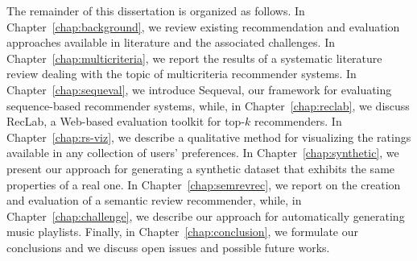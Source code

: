 The remainder of this dissertation is organized as follows. In Chapter~\ref{chap:background}, we review existing recommendation and evaluation approaches available in literature and the associated challenges. In Chapter~\ref{chap:multicriteria}, we report the results of a systematic literature review dealing with the topic of multicriteria recommender systems. In Chapter~\ref{chap:sequeval}, we introduce Sequeval, our framework for evaluating sequence-based recommender systems, while, in Chapter~\ref{chap:reclab}, we discuss RecLab, a Web-based evaluation toolkit for top-$k$ recommenders. In Chapter~\ref{chap:rs-viz}, we describe a qualitative method for visualizing the ratings available in any collection of users' preferences. In Chapter~\ref{chap:synthetic}, we present our approach for generating a synthetic dataset that exhibits the same properties of a real one. In Chapter~\ref{chap:semrevrec}, we report on the creation and evaluation of a semantic review recommender, while, in Chapter~\ref{chap:challenge}, we describe our approach for automatically generating music playlists. Finally, in Chapter~\ref{chap:conclusion}, we formulate our conclusions and we discuss open issues and possible future works.
